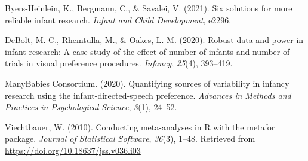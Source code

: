 \documentclass[
  man, donotrepeattitle,floatsintext]{apa6}
\newlength{\cslhangindent}
\newlength{\cslentryspacingunit} %
\newenvironment{CSLReferences}[2] %
 {%
  \setlength{\parindent}{0pt}
  \ifodd #1
  \let\oldpar\par
  \def\par{\hangindent=\cslhangindent\oldpar}
  \fi
  \setlength{\parskip}{#2\cslentryspacingunit}
 }%
 {}
\begin{document}
\begingroup
\setlength{\parindent}{-0.5in}
\setlength{\leftskip}{0.5in}

\hypertarget{refs}{}
\begin{CSLReferences}{1}{0}
\leavevmode{}%
Byers-Heinlein, K., Bergmann, C., \& Savalei, V. (2021). Six solutions for more reliable infant research. \emph{Infant and Child Development}, e2296.

\leavevmode{}%
DeBolt, M. C., Rhemtulla, M., \& Oakes, L. M. (2020). Robust data and power in infant research: A case study of the effect of number of infants and number of trials in visual preference procedures. \emph{Infancy}, \emph{25}(4), 393--419.

\leavevmode{}%
ManyBabies Consortium. (2020). Quantifying sources of variability in infancy research using the infant-directed-speech preference. \emph{Advances in Methods and Practices in Psychological Science}, \emph{3}(1), 24--52.

\leavevmode{}%
Viechtbauer, W. (2010). Conducting meta-analyses in {R} with the {metafor} package. \emph{Journal of Statistical Software}, \emph{36}(3), 1--48. Retrieved from \url{https://doi.org/10.18637/jss.v036.i03}

\end{CSLReferences}

\endgroup
\end{document}
